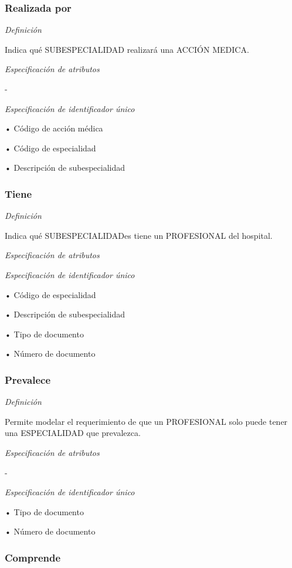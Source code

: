 \documentclass[a4paper,11pt]{article}
\begin{document}
\subsubsection{\textbf{Realizada por}}

\textit{Definición}

Indica qué SUBESPECIALIDAD realizará una ACCIÓN MEDICA.

\textit{Especificación de atributos}

-

\textit{Especificación de identificador único}

• Código de acción médica

• Código de especialidad

• Descripción de subespecialidad\label{HToc293405826}

\subsubsection{\textbf{Tiene}}

\textit{Definición}

Indica qué SUBESPECIALIDADes tiene un PROFESIONAL del hospital.

\textit{Especificación de atributos}

\textit{Especificación de identificador único}

• Código de especialidad

• Descripción de subespecialidad

• Tipo de documento

• Número de documento\label{HToc293405827}

\subsubsection{\textbf{Prevalece}}

\textit{Definición}

Permite modelar el requerimiento de que un PROFESIONAL solo puede tener una ESPECIALIDAD 
que prevalezca.

\textit{Especificación de atributos}

-

\textit{Especificación de identificador único}

• Tipo de documento

• Número de documento\label{HToc293405828}

\subsubsection{\textbf{Comprende}}
\end{document}
